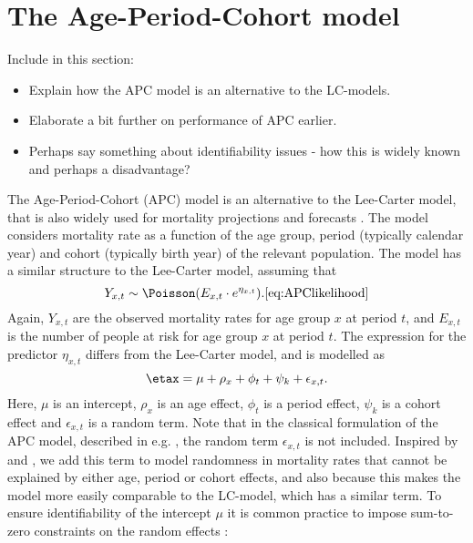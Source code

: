 \newpage
\section{The Age-Period-Cohort model}
\label{sec:APC-model}
\textcolor{myDarkGreen}{
Include in this section:
\begin{itemize}
    \item Explain how the APC model is an alternative to the LC-models.
    \item Elaborate a bit further on performance of APC earlier. 
    \item Perhaps say something about identifiability issues - how this is widely known and perhaps a disadvantage?
\end{itemize}
}
The Age-Period-Cohort (APC) model is an alternative to the Lee-Carter model, that is also widely used for mortality projections and forecasts \cite{rieblerHeld2010}. The model considers mortality rate as a function of the age group, period (typically calendar year) and cohort (typically birth year) of the relevant population. The model has a similar structure to the Lee-Carter model, assuming that 
\begin{equation}
    Y_{x,t} \sim \Poisson(E_{x,t}\cdot e^{\eta_{x,t}}).
    \ref{eq:APClikelihood}
\end{equation}
Again, $Y_{x,t}$ are the observed mortality rates for age group $x$ at period $t$, and $E_{x,t}$ is the number of people at risk for age group $x$ at period $t$. The expression for the predictor $\eta_{x,t}$ differs from the Lee-Carter model, and is modelled as
\begin{equation}
    \etax = \mu + \rho_x + \phi_t + \psi_k + \epsilon_{x,t}.
    \label{eq:APCmodel}
\end{equation}
Here, $\mu$ is an intercept, $\rho_x$ is an age effect, $\phi_t$ is a period effect, $\psi_k$ is a cohort effect and $\epsilon_{x,t}$ is a random term. Note that in the classical formulation of the APC model, described in e.g. \textcite{Clayton1987}, the random term $\epsilon_{x,t}$ is not included. Inspired by \textcite{RieblerThesis2010} and \textcite{Besag1995}, we add this term to model randomness in mortality rates that cannot be explained by either age, period or cohort effects, and also because this makes the model more easily comparable to the LC-model, which has a similar term. 
\newline
\noindent To ensure identifiability of the intercept $\mu$ it is common practice to impose sum-to-zero constraints on the random effects \cite{RieblerThesis2010}:
